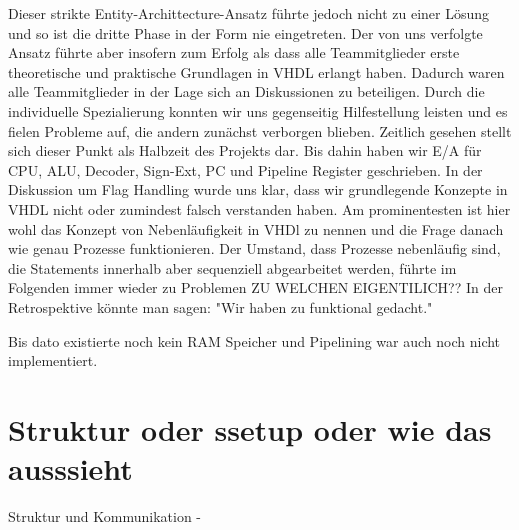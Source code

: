 \documentclass[paper=a4,fontsize=12pt]{scrreprt}
\begin{document}
Dieser strikte Entity-Archittecture-Ansatz führte jedoch nicht zu einer Lösung und so ist die dritte Phase in der Form nie eingetreten. Der von uns verfolgte Ansatz führte aber insofern zum Erfolg als dass alle Teammitglieder erste theoretische und praktische Grundlagen in VHDL erlangt haben.
Dadurch waren alle Teammitglieder in der Lage sich an Diskussionen zu beteiligen. Durch die individuelle Spezialierung konnten wir uns gegenseitig Hilfestellung leisten und es fielen Probleme auf, die andern zunächst verborgen blieben. Zeitlich gesehen stellt sich dieser Punkt als Halbzeit des Projekts dar.
Bis dahin haben wir E/A für CPU, ALU, Decoder, Sign-Ext, PC und Pipeline Register geschrieben.
In der Diskussion um Flag Handling wurde uns klar, dass wir grundlegende Konzepte in VHDL nicht oder zumindest falsch verstanden haben. Am prominentesten ist hier wohl das Konzept von Nebenläufigkeit in VHDl zu nennen und die Frage danach wie genau Prozesse funktionieren. Der Umstand, dass Prozesse nebenläufig sind, die Statements innerhalb aber sequenziell abgearbeitet werden, führte im Folgenden immer wieder zu Problemen {\color{red}ZU WELCHEN EIGENTILICH??}
In der Retrospektive könnte man sagen: "Wir haben zu funktional gedacht."


Bis dato existierte noch kein RAM Speicher und Pipelining war auch noch nicht implementiert.


\section{Struktur oder ssetup oder wie das ausssieht}
Struktur und Kommunikation -

\end{document}
